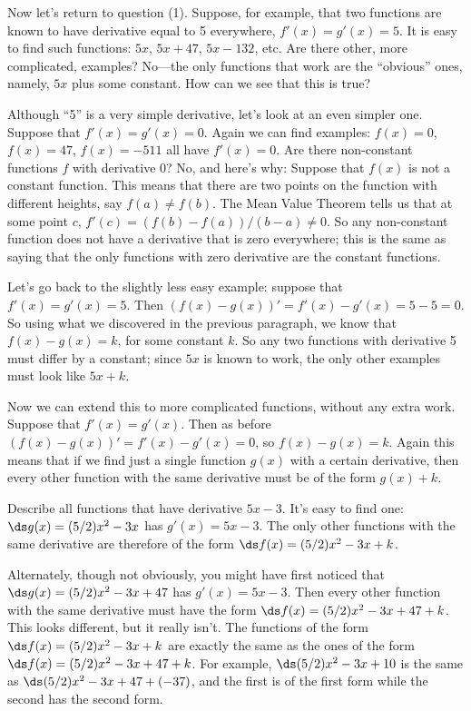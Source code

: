 Now let's return to question (1). Suppose, for example, that two
functions are known to have derivative equal to 5 everywhere,
$f'(x)=g'(x)=5$. It is easy to find such functions: $5x$, $5x+47$,
$5x-132$, etc. Are there other, more complicated, examples? No---the
only functions that work are the ``obvious'' ones, namely, $5x$ plus
some constant. How can we see that this is true?

Although ``5'' is a very simple derivative, let's look at an even
simpler one. Suppose that $f'(x)=g'(x)=0$. Again we can find examples:
$f(x)=0$, $f(x)=47$, $f(x)=-511$ all have $f'(x)=0$. Are there
non-constant functions $f$ with derivative 0? No, and here's why:
Suppose that $f(x)$ is not a constant function. This means that there
are two points on the function with different heights, say
$f(a)\not=f(b)$. The Mean Value Theorem tells us that at some point
$c$, $f'(c)=(f(b)-f(a))/(b-a)\not=0$. So any non-constant function
does not have a derivative that is zero everywhere; this is the same
as saying that the only functions with zero derivative are the
constant functions.

Let's go back to the slightly less easy example: suppose that 
$f'(x)=g'(x)=5$. Then $(f(x)-g(x))' = f'(x)-g'(x) = 5 -5 =0$. So using
what we discovered in the previous paragraph, we know that
$f(x)-g(x)=k$, for some constant $k$. So any two functions with
derivative 5 must differ by a constant; since $5x$ is known to work,
the only other examples must look like $5x+k$.

Now we can extend this to more complicated functions, without any
extra work. Suppose that $f'(x)=g'(x)$. Then as before
$(f(x)-g(x))' = f'(x)-g'(x) =0$, so $f(x)-g(x)=k$. Again this means
that if we find just a single function $g(x)$ with a certain
derivative, then every other function with the same derivative must be
of the form $g(x)+k$.

\begin{example}
Describe all functions that have derivative $5x-3$. It's easy to find
one: $\ds g(x)=(5/2)x^2-3x$ has $g'(x)=5x-3$. The only other functions
with the same derivative are therefore of the form
$\ds f(x)=(5/2)x^2-3x+k$.

Alternately, though not obviously, you might have first noticed that 
$\ds g(x)=(5/2)x^2-3x+47$ has $g'(x)=5x-3$. Then every other function
with the same derivative must have the form $\ds f(x)=(5/2)x^2-3x+47+k$.
This looks different, but it really isn't. The functions of the form
$\ds f(x)=(5/2)x^2-3x+k$ are exactly the same as the ones of the form
$\ds f(x)=(5/2)x^2-3x+47+k$. For example, $\ds (5/2)x^2-3x+10$ is the same as
$\ds (5/2)x^2-3x+47+(-37)$, and the first is of the first form while
the second has the second form.
\end{example}

